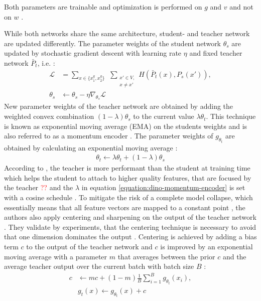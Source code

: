 Both parameters are trainable and optimization is performed on $g$ and $v$ and not on $w$ \citep{Salimans2016}.
\par
While both networks share the same architecture, student- and teacher network are updated differently. 
The parameter weights of the student network $\theta_s$ are updated by stochastic gradient descent with learning rate $\eta$ and fixed teacher network $\bar{P}_t$, i.e. \citep{Caron2021}:
\begin{align}
	\mathcal{L} &= \sum_{x \in \{x_1^g, x_2^g\}} \hspace{5pt} \sum_{\substack{ x\prime \in V, \\ x\neq x\prime}} H(\bar P_t(x),P_s(x\prime)), \\ 
	\theta_s &\leftarrow \theta_s - \eta \nabla_{\theta_s} \mathcal{L}
\end{align}
New parameter weights of the teacher network are obtained by adding the weighted convex combination $(1-\lambda)\theta_s$ to the current value $\lambda\theta_t$.
This technique is known as exponential moving average (EMA) on the students weights and is also referred to as a momentum encoder \citep{He2019,Caron2021}.
The parameter weights of $g_{\theta_t}$ are obtained by calculating an exponential moving average \citep{Grill2020,Caron2021}: 
\begin{align}
	\theta_t \leftarrow \lambda \theta_t + (1-\lambda) \theta_s
	\label{equation:dino-momentum-encoder}
\end{align}
According to \citep{Caron2021}, the teacher is more performant than the student at training time which helps the student to attach to higher quality features, that are focused by the teacher \textcolor{red}{??} and the $\lambda$ in equation \ref{equation:dino-momentum-encoder} is set with a cosine schedule \citep{Grill2020}.
To mitigate the risk of a complete model collapse, which essentially means that all feature vectors are mapped to a constant point \citep{Jing2022}, the authors also apply centering and sharpening on the output of the teacher network \citep{Caron2021}.
They validate by experiments, that the centering technique is necessary to avoid that one dimension dominates the output \citep{Caron2021}.
Centering is achieved by adding a bias term $c$ to the output of the teacher network and $c$ is improved by an exponential moving average with a parameter $m$ that averages between the prior $c$ and the average teacher output over the current batch with batch size $B$ \citep{Caron2021}:
\begin{align}
	c & \leftarrow mc + (1-m) \frac{1}{B}\sum_{i=1}^B g_{\theta_t}(x_i), \\
	& g_t(x) \leftarrow g_{\theta_t}(x) + c
	\label{equation:dino-centering}
\end{align}
